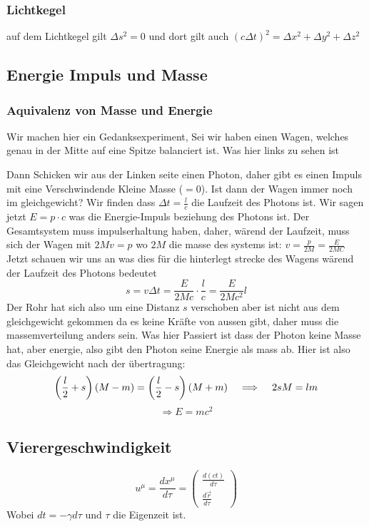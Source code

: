 \documentclass{article}
\newcommand{\mspc}{\hspace{0.4cm}}
\begin{document}
\subsubsection*{Lichtkegel} auf dem Lichtkegel gilt $\Delta s^2=0$ und dort gilt auch $(c\Delta t)^2=\Delta x^2+\Delta y^2+\Delta z^2$
\newpage
\subsection*{Energie Impuls und Masse}
\subsubsection*{Aquivalenz von Masse und Energie}
\begin{multicols}{2}Wir machen hier ein Gedanksexperiment, Sei wir haben einen Wagen, welches genau in der Mitte auf eine Spitze balanciert ist. Was hier links zu sehen ist\vfill\null\columnbreak{}\end{multicols}
Dann Schicken wir aus der Linken seite einen Photon, daher gibt es einen Impuls mit eine Verschwindende Kleine Masse ($=0$). Ist dann der Wagen immer noch im gleichgewicht? Wir finden dass $\Delta t=\frac{l}{c}$ die Laufzeit des Photons ist. Wir sagen jetzt $E=p\cdot c$ was die Energie-Impuls beziehung des Photons ist. Der Gesamtsystem muss impulserhaltung haben, daher, wärend der Laufzeit, muss sich der Wagen mit $2Mv=p$ wo $2M$ die masse des systems ist: $v=\frac{p}{2M}=\frac{E}{2MC}$ Jetzt schauen wir uns an was dies für die hinterlegt strecke des Wagens wärend der Laufzeit des Photons bedeutet
\[s=v\Delta t=\frac{E}{2Mc}\cdot\frac{l}{c}=\frac{E}{2Mc^2}l\] Der Rohr hat sich also um eine Distanz $s$ verschoben aber ist nicht aus dem gleichgewicht gekommen da es keine Kräfte von aussen gibt, daher muss die massemverteilung anders sein.
Was hier Passiert ist dass der Photon keine Masse hat, aber energie, also gibt den Photon seine Energie als mass ab. Hier ist also das Gleichgewicht nach der übertragung:
\[\left(\frac{l}{2}+s\right)\left(M-m\right)=\left(\frac{l}{2}-s\right)(M+m)\mspc\Longrightarrow \mspc2sM=lm\]
\[\Longrightarrow \boxed{E=mc^2}\]
\subsection*{Vierergeschwindigkeit}
\[u^\mu=\frac{dx^\mu}{d\tau}=\begin{pmatrix}\frac{d(ct)}{d\tau}\\\frac{d\vec{r}}{d\tau}\end{pmatrix}\]
Wobei $dt=-\gamma d\tau$ und $\tau$ die Eigenzeit ist.
\end{document}
